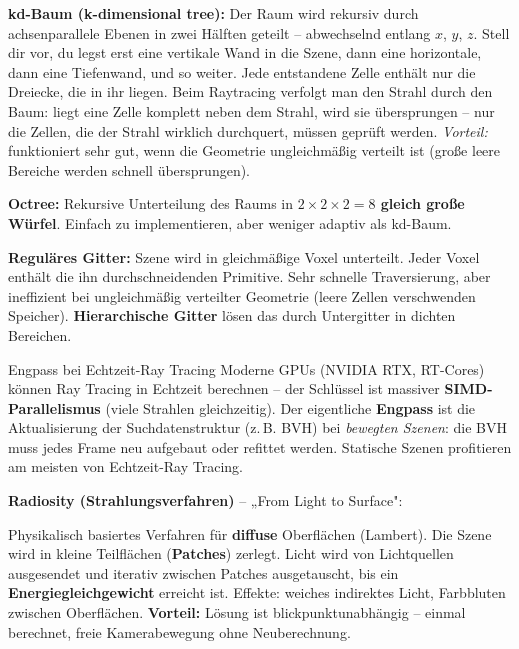 \documentclass[12pt, a4paper]{article}
\begin{document}
\textbf{kd-Baum (k-dimensional tree):} Der Raum wird rekursiv durch achsenparallele Ebenen in zwei Hälften geteilt -- abwechselnd entlang $x$, $y$, $z$. Stell dir vor, du legst erst eine vertikale Wand in die Szene, dann eine horizontale, dann eine Tiefenwand, und so weiter. Jede entstandene Zelle enthält nur die Dreiecke, die in ihr liegen. Beim Raytracing verfolgt man den Strahl durch den Baum: liegt eine Zelle komplett neben dem Strahl, wird sie übersprungen -- nur die Zellen, die der Strahl wirklich durchquert, müssen geprüft werden. \textit{Vorteil:} funktioniert sehr gut, wenn die Geometrie ungleichmäßig verteilt ist (große leere Bereiche werden schnell übersprungen).

\textbf{Octree:} Rekursive Unterteilung des Raums in \textbf{$2\times2\times2 = 8$ gleich große Würfel}. Einfach zu implementieren, aber weniger adaptiv als kd-Baum.

\textbf{Reguläres Gitter:} Szene wird in gleichmäßige Voxel unterteilt. Jeder Voxel enthält die ihn durchschneidenden Primitive. Sehr schnelle Traversierung, aber ineffizient bei ungleichmäßig verteilter Geometrie (leere Zellen verschwenden Speicher). \textbf{Hierarchische Gitter} lösen das durch Untergitter in dichten Bereichen.

\begin{notebox}{Engpass bei Echtzeit-Ray Tracing}
Moderne GPUs (NVIDIA RTX, RT-Cores) können Ray Tracing in Echtzeit berechnen -- der Schlüssel ist massiver \textbf{SIMD-Parallelismus} (viele Strahlen gleichzeitig). Der eigentliche \textbf{Engpass} ist die Aktualisierung der Suchdatenstruktur (z.\,B. BVH) bei \textit{bewegten Szenen}: die BVH muss jedes Frame neu aufgebaut oder refittet werden. Statische Szenen profitieren am meisten von Echtzeit-Ray Tracing.
\end{notebox}

\medskip
\textbf{Radiosity (Strahlungsverfahren)} -- „From Light to Surface":

Physikalisch basiertes Verfahren für \textbf{diffuse} Oberflächen (Lambert). Die Szene wird in kleine Teilflächen (\textbf{Patches}) zerlegt. Licht wird von Lichtquellen ausgesendet und iterativ zwischen Patches ausgetauscht, bis ein \textbf{Energiegleichgewicht} erreicht ist. Effekte: weiches indirektes Licht, Farbbluten zwischen Oberflächen. \textbf{Vorteil:} Lösung ist blickpunktunabhängig -- einmal berechnet, freie Kamerabewegung ohne Neuberechnung.
\end{document}
